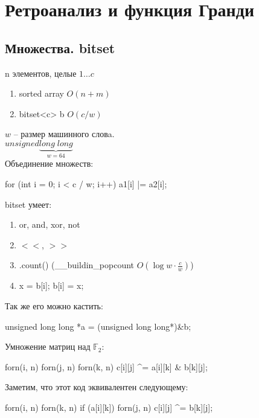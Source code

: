 \chapter{Ретроанализ и функция Гранди}

\section {Множества. bitset}
n элементов, целые $1 \dots c$
\begin{enumerate}
\item sorted array $O(n + m)$\\
\item bitset<c> b $O(c/w)$\\
\end{enumerate}
$w$ -- размер машинного словa.\\
$unsigned \underbrace{long \; long}_{w = 64}$\\

Объединение множеств:
\begin{cppcode}
for (int i = 0; i < c / w; i++) {
    a1[i] |= a2[i];
}
\end{cppcode}

bitset умеет:
\begin{enumerate}
\item or, and, xor, not
\item $<<$, $>>$
\item .count() (\_\_buildin\_popcount $O(\log w \cdot \frac{c}{w})$)
\item
\begin{cppcode}
x = b[i];
b[i] = x;
\end{cppcode}
\end{enumerate}

Так же его можно кастить:\\
\begin{cppcode}
unsigned long long *a = (unsigned long long*)&b;
\end{cppcode}

Умножение матриц над $\mathbb{F}_2$:
\begin{cppcode}
forn(i, n) {
    forn(j, n) {
        forn(k, n) {
            c[i][j] ^= a[i][k] & b[k][j];
        }
    }
}
\end{cppcode}

Заметим, что этот код эквивалентен следующему:
\begin{cppcode}
forn(i, n) {
    forn(k, n) {
        if (a[i][k]) {
            forn(j, n) {
                c[i][j] ^= b[k][j];
            }
        }
    }
}
\end{cppcode}

